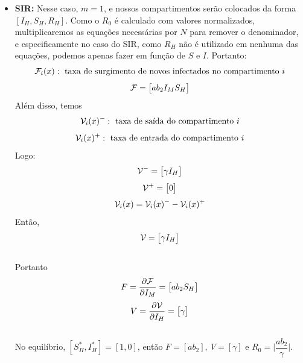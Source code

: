 \documentclass[12pt]{article}
\begin{document}
\begin{itemize}
\item \textbf{SIR:}
Nesse caso, $m=1$, e nossos compartimentos serão colocados da forma $[I_H, S_H, R_H]$. Como o $R_0$ é calculado com valores normalizados, multiplicaremos as equações necessárias por $N$ para remover o denominador, e especificamente no caso do SIR, como $R_H$ não é utilizado em nenhuma das equações, podemos apenas fazer em função de $S$ e $I$. Portanto:
$$ {\cal F}_i(x): \text{ taxa de surgimento de novos infectados no compartimento } i $$
$$ {\cal F} =\begin{bmatrix}
a  b_2  I_M  S_H \\
\end{bmatrix} $$
Além disso, temos
$$ {\cal V}_i(x)^-: \text{ taxa de saída do compartimento } i $$
$$ {\cal V}_i(x)^+: \text{ taxa de entrada do compartimento } i $$
Logo:
$$
{\cal V^-} = \begin{bmatrix}
\gamma I_H\\
\end{bmatrix}
$$
$$
{\cal V^+} = \begin{bmatrix}
0\\
\end{bmatrix}
$$
$${\cal V}_i (x) = {\cal V}_i(x)^{-} - {\cal V}_i(x)^+$$
Então,
$$
{\cal V} =
\begin{bmatrix}
\gamma I_H\\
\end{bmatrix}
$$
\\
Portanto
$$ F = \dfrac{\partial{\cal F}}{\partial I_M} =\begin{bmatrix}
a  b_2  S_H \\
\end{bmatrix} $$
$$ V = \dfrac{\partial{\cal V}}{\partial I_H} =\begin{bmatrix}
\gamma \\
\end{bmatrix} $$
\\No equilíbrio, $[S_H^*, I_H^*] = [1,0]$, então $F=[a  b_2], \ V = [\gamma]$ e $R_0 = \Big | \dfrac{ab_2}{\gamma}\Big | $.


\end{itemize}
\end{document}
